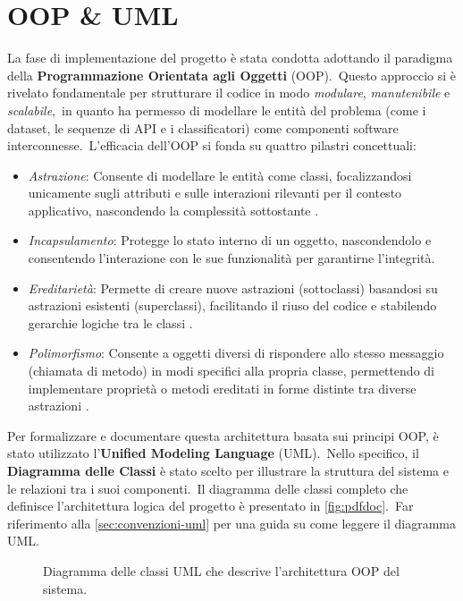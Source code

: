 \section{OOP \& UML}

La fase di implementazione del progetto è stata condotta adottando il paradigma della \textbf{Programmazione Orientata agli Oggetti} (OOP).\
Questo approccio si è rivelato fondamentale per strutturare il codice in modo \textit{modulare}, \textit{manutenibile} e \textit{scalabile},\
in quanto ha permesso di modellare le entità del problema (come i dataset, le sequenze di API e i classificatori) come componenti software interconnesse.\
L'efficacia dell'OOP si fonda su quattro pilastri concettuali:
\begin{itemize}
    \item \textit{Astrazione}: Consente di modellare le entità come classi, focalizzandosi unicamente sugli attributi e sulle interazioni rilevanti per il contesto applicativo,
          nascondendo la complessità sottostante .
    \item \textit{Incapsulamento}: Protegge lo stato interno di un oggetto, nascondendolo e consentendo l'interazione con le sue funzionalità per garantirne l'integrità.
    \item \textit{Ereditarietà}: Permette di creare nuove astrazioni (sottoclassi) basandosi su astrazioni esistenti (superclassi),
          facilitando il riuso del codice e stabilendo gerarchie logiche tra le classi .
    \item \textit{Polimorfismo}: Consente a oggetti diversi di rispondere allo stesso messaggio (chiamata di metodo) in modi specifici alla propria classe,
          permettendo di implementare proprietà o metodi ereditati in forme distinte tra diverse astrazioni \mycite{oop}.
\end{itemize}

Per formalizzare e documentare questa architettura basata sui principi OOP, è stato utilizzato l'\textbf{Unified Modeling Language} (UML).\
Nello specifico, il \textbf{Diagramma delle Classi} è stato scelto per illustrare la struttura del sistema e le relazioni tra i suoi componenti.\
Il diagramma delle classi completo che definisce l'architettura logica del progetto è presentato in \autoref{fig:pdfdoc}.\
Far riferimento alla \autoref{sec:convenzioni-uml} per una guida su come leggere il diagramma UML.

\begin{figure}[htbp] %
    \centering
    \caption{Diagramma delle classi UML che descrive l'architettura OOP del sistema.}
    \label{fig:pdfdoc}
\end{figure}


